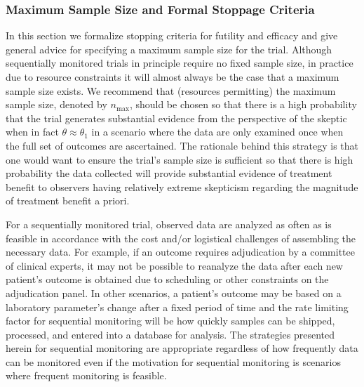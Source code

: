 \documentclass[useAMS,usenatbib,referee]{biom}
\begin{document}
\subsubsection{Maximum Sample Size and Formal Stoppage Criteria}
In this section we formalize stopping criteria for futility and efficacy and give general 
advice for specifying a maximum sample size for the trial.
%
Although sequentially monitored trials in principle require no fixed sample size, in practice due to resource 
constraints it will almost always be the case that a maximum sample size exists. 
%
We recommend that (resources permitting) the maximum sample size, denoted by $n_{\text{max}}$, should be chosen so that there is a 
high probability that the trial generates substantial evidence from the perspective of the skeptic when in 
fact $\theta \approx \theta_1$ in a scenario where the data are only examined once when the full set of 
outcomes are ascertained.
%
The rationale behind this strategy is that one would want to ensure the trial's sample size is sufficient so that
there is high probability the data collected will provide substantial evidence of treatment benefit to observers 
having relatively extreme skepticism regarding the magnitude of treatment benefit a priori.  


For a sequentially monitored trial, observed data are analyzed as often as is feasible in accordance with 
the cost and/or logistical challenges of assembling the necessary data.
%
For example, if an outcome requires adjudication by a committee of clinical experts, it may not be possible to reanalyze the
data after each new patient's outcome is obtained due to scheduling or other constraints on the adjudication panel.
%
In other scenarios, a patient's outcome may be based on a laboratory parameter's change after a fixed period of time
and the rate limiting factor for sequential monitoring will be how quickly samples can be shipped, processed, and entered
into a database for analysis.  
%
The strategies presented herein for sequential monitoring are appropriate regardless of how frequently data can be monitored
even if the motivation for sequential monitoring is scenarios where frequent monitoring is feasible.

\end{document}
